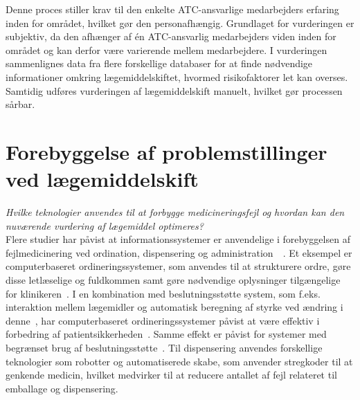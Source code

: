 Denne proces stiller krav til den enkelte ATC-ansvarlige medarbejders erfaring inden for området, hvilket gør den personafhængig. Grundlaget for vurderingen er subjektiv, da den afhænger af én ATC-ansvarlig medarbejders viden inden for området og kan derfor være varierende mellem medarbejdere. I vurderingen sammenlignes data fra flere forskellige databaser for at finde nødvendige informationer omkring lægemiddelskiftet, hvormed risikofaktorer let kan overses. Samtidig udføres vurderingen af lægemiddelskift manuelt, hvilket gør processen sårbar.





\section{Forebyggelse af problemstillinger ved lægemiddelskift}
\textit{Hvilke teknologier anvendes til at forbygge medicineringsfejl og hvordan kan den nuværende vurdering af lægemiddel optimeres?} \\
Flere studier har påvist at informationssystemer er anvendelige i forebyggelsen af fejlmedicinering ved ordination, dispensering og administration~~\citep{Agrawal2009, Kaushal2002, Stenner2010, Fischer2008, Simpson2008, Bates2000a}. Et eksempel er computerbaseret ordineringssystemer, som anvendes til at strukturere ordre, gøre disse letlæselige og fuldkommen samt gøre nødvendige oplysninger tilgængelige for klinikeren~\citep{Agrawal2009,Bates2000a}. I en kombination med beslutningsstøtte system, som f.eks. interaktion mellem lægemidler og automatisk beregning af styrke ved ændring i denne~\citep{Agrawal2009}, har computerbaseret ordineringssystemer påvist at være effektiv i forbedring af patientsikkerheden~\citep{Agrawal2009, Bates2000a}. Samme effekt er påvist for systemer med begrænset brug af beslutningsstøtte~\citep{Bates2000a}. Til dispensering anvendes forskellige teknologier som robotter og automatiserede skabe, som anvender stregkoder til at genkende medicin, hvilket medvirker til at reducere antallet af fejl relateret til emballage og dispensering.~\citep{Agrawal2009}

